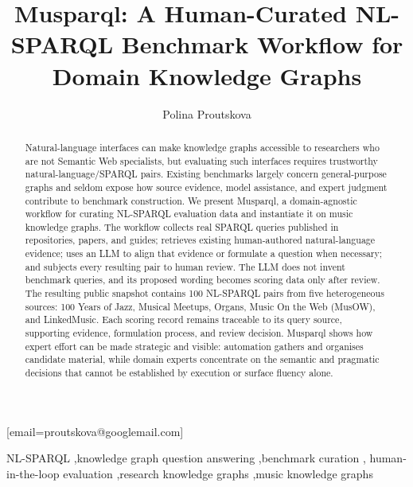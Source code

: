 \documentclass[noerr]{ceurart}
\begin{document}

\title{Musparql: A Human-Curated NL-SPARQL Benchmark Workflow for Domain Knowledge Graphs}

\author[1]{Polina Proutskova}[email=proutskova@googlemail.com]
\address[1]{Industry Commons Foundation, Stockholm, Sweden}

\begin{abstract}
Natural-language interfaces can make knowledge graphs accessible to researchers
who are not Semantic Web specialists, but evaluating such interfaces requires
trustworthy natural-language/SPARQL pairs. Existing benchmarks largely concern
general-purpose graphs and seldom expose how source evidence, model assistance,
and expert judgment contribute to benchmark construction. We present Musparql,
a domain-agnostic workflow for curating NL-SPARQL evaluation data and instantiate
it on music knowledge graphs. The workflow collects real SPARQL queries published
in repositories, papers, and guides; retrieves existing human-authored
natural-language evidence; uses an LLM to align that evidence or formulate a
question when necessary; and subjects every resulting pair to human review. The
LLM does not invent benchmark queries, and its proposed wording becomes scoring
data only after review. The resulting public snapshot contains 100 NL-SPARQL
pairs from five heterogeneous sources: 100 Years of Jazz, Musical Meetups,
Organs, Music On the Web (MusOW), and LinkedMusic. Each scoring record remains
traceable to its query source, supporting evidence, formulation process, and
review decision. Musparql shows how expert effort can be made strategic and
visible: automation gathers and organises candidate material, while domain
experts concentrate on the semantic and pragmatic decisions that cannot be
established by execution or surface fluency alone.
\end{abstract}

\begin{keywords}
NL-SPARQL \sep knowledge graph question answering \sep benchmark curation \sep
human-in-the-loop evaluation \sep research knowledge graphs \sep music knowledge graphs
\end{keywords}

\maketitle




\end{document}

